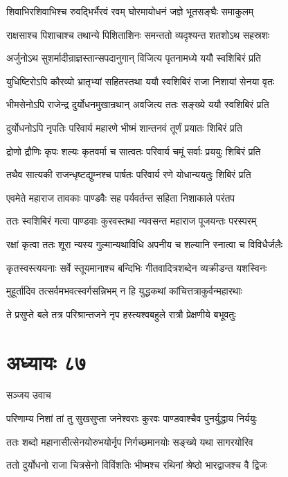 \twolineshloka
{शिवाभिरशिवाभिश्च रुवद्भिर्भैरवं रवम्}
{घोरमायोधनं जज्ञे भूतसङ्घैः समाकुलम्}


\twolineshloka
{राक्षसाश्च पिशाचाश्च तथान्ये पिशिताशिनः}
{समन्ततो व्यदृश्यन्त शतशोऽथ सहस्रशः}


\twolineshloka
{अर्जुनोऽथ सुशर्मादीन्राज्ञस्तान्सपदानुगान्}
{विजित्य पृतनामध्ये ययौ स्वशिबिरं प्रति}


\twolineshloka
{युधिष्टिरोऽपि कौरव्यो भ्रातृभ्यां सहितस्तथा}
{ययौ स्वशिबिरं राजा निशायां सेनया वृतः}


\twolineshloka
{भीमसेनोऽपि राजेन्द्र दुर्योधनमुखान्रथान्}
{अवजित्य ततः सङ्ख्ये ययौ स्वशिबिरं प्रति}


\twolineshloka
{दुर्योधनोऽपि नृपतिः परिवार्य महारणे}
{भीष्मं शान्तनवं तूर्णं प्रयातः शिबिरं प्रति}


\twolineshloka
{द्रोणो द्रौणिः कृपः शल्यः कृतवर्मा च सात्वतः}
{परिवार्य चमूं सर्वाः प्रययुः शिबिरं प्रति}


\twolineshloka
{तथैव सात्यकी राजन्धृष्टद्युम्नश्च पार्षतः}
{परिवार्य रणे योधान्ययतुः शिबिरं प्रति}


\twolineshloka
{एवमेते महाराज तावकाः पाण्डवैः सह}
{पर्यवर्तन्त सहिता निशाकाले परंतप}


\twolineshloka
{ततः स्वशिबिरं गत्वा पाण्डवाः कुरवस्तथा}
{न्यवसन्त महाराज पूजयन्तः परस्परम्}


\twolineshloka
{रक्षां कृत्वा ततः शूरा न्यस्य गुल्मान्यथाविधि}
{अपनीय च शल्यानि स्नात्वा च विविधैर्जलैः}


\twolineshloka
{कृतस्वस्त्ययनाः सर्वे स्तूयमानाश्च बन्दिभिः}
{गीतवादित्रशब्देन व्यक्रीडन्त यशस्विनः}


\twolineshloka
{मुहूर्तादिव तत्सर्वमभवत्स्वर्गसन्निभम्}
{न हि युद्धकथां कांचित्तत्राकुर्वन्महारथाः}


\twolineshloka
{ते प्रसुप्ते बले तत्र परिश्रान्तजने नृप}
{हस्त्यश्वबहुले रात्रौ प्रेक्षणीये बभूवतुः}


\chapter{अध्यायः ८७}
\twolineshloka
{सञ्जय उवाच}
{}


\twolineshloka
{परिणाम्य निशां तां तु सुखसुप्ता जनेश्वराः}
{कुरवः पाण्डवाश्चैव पुनर्युद्धाय निर्ययुः}


\twolineshloka
{ततः शब्दो महानासीत्सेनयोरुभयोर्नृप}
{निर्गच्छमानयोः सङ्ख्ये यथा सागरयोरिव}


\twolineshloka
{ततो दुर्योधनो राजा चित्रसेनो विविंशतिः}
{भीष्मश्च रथिनां श्रेष्ठो भारद्वाजश्च वै द्विजः}


